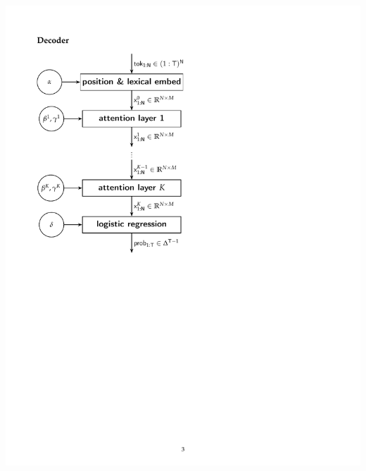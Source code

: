 \documentclass[9pt]{report}
\begin{document}
{
\hfill\includegraphics[height=\textheight]{img/transformer-diagram.pdf}

}
\end{document}

